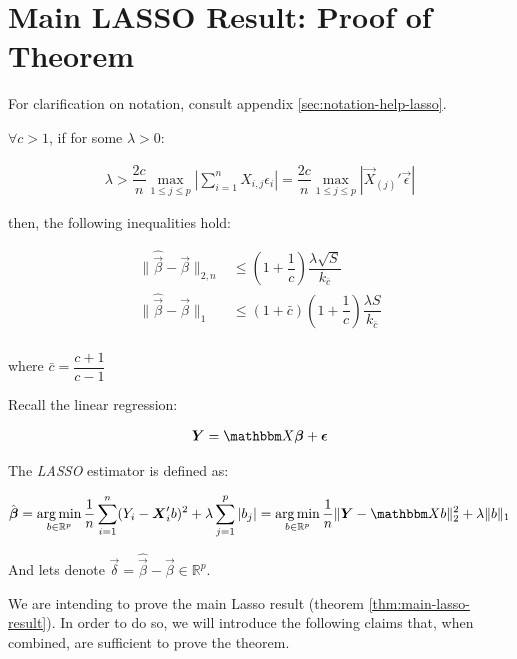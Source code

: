 \section{
    Main LASSO Result: Proof of Theorem 
}

For clarification on notation, consult appendix \ref{sec:notation-help-lasso}.

\begin{theorem}
\label{thm:main-lasso-result}
$\forall c > 1$, if for some $\lambda > 0$:

\begin{align*}
\lambda > \dfrac{2c}{n}
\max_{1 \leq j \leq p} \left|
    \sum_{i=1}^{n}X_{i,j} \epsilon_i
\right|
= 
\dfrac{2c}{n}
\max_{1 \leq j \leq p} \left|
    \Vec{X}_{(j)}' \Vec{\epsilon}
\right|
\end{align*}

then, the following inequalities hold:

\begin{align*}
\|\hat{\Vec{\beta}} - \Vec{\beta}\|_{2, n}
&\leq 
\left(1 + \dfrac{1}{c}\right)
\dfrac{\lambda \sqrt{S}}{k_{\bar{c}}}\\
\|\hat{\Vec{\beta}} - \Vec{\beta}\|_{1}
&\leq 
\left(1 + \bar{c}\right) \left(1 + \dfrac{1}{c}\right)
\dfrac{\lambda S}{k_{\bar{c}}}\\
\end{align*}

where $\bar{c} = \dfrac{c+1}{c-1}$
\end{theorem}

Recall the linear regression:

\begin{align}
    \Vec{Y} = \Mat{X} \Vec{\beta} + \Vec{\epsilon}
    \label{eq:linear-regression}
\end{align}

The \emph{LASSO} estimator is defined as:

\begin{align}
\hat{\Vec{\beta}} 
=  \argmin_{b \in \mathbb{R}^p} 
    \dfrac{1}{n} \sum_{i=1}^{n} (Y_i - \Vec{X}_i' b)^2
    + \lambda \sum_{j=1}^{p} |b_j|
= \argmin_{b \in \mathbb{R}^p} 
    \dfrac{1}{n} \|\Vec{Y} - \Mat{X} b\|_{2}^{2}
    + \lambda \|b\|_{1}
\label{eq:lasso-estimator}
\end{align}

And lets denote $\Vec{\delta} = \hat{\Vec{\beta}} - \Vec{\beta} \in \mathbb{R}^p$.

We are intending to prove the main Lasso result (theorem \ref{thm:main-lasso-result}). In order to do so, we will introduce the following claims that, when combined, are sufficient to prove the theorem.

